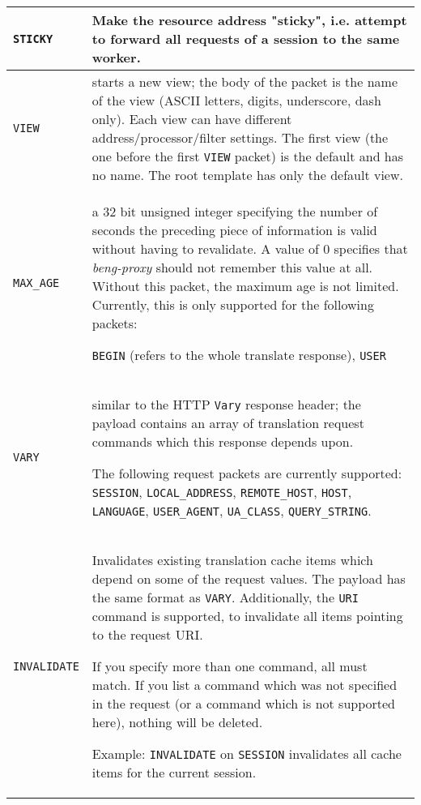 \documentclass[a4paper,12pt]{article}
\begin{document}
\begin{longtable}{|l|p{8cm}|}
\hline

\verb|STICKY| & Make the resource address "sticky", i.e. attempt to
forward all requests of a session to the same worker. \\

\hline

\verb|VIEW| & starts a new view; the body of the packet is the name
of the view (ASCII letters, digits, underscore, dash only).  Each view
can have different address/processor/filter settings.  The first view
(the one before the first \verb|VIEW| packet) is the default and has
no name.  The root template has only the default view. \\

\hline

\verb|MAX_AGE| & a 32 bit unsigned integer specifying the number of
seconds the preceding piece of information is valid without having to
revalidate.  A value of 0 specifies that \emph{beng-proxy} should not
remember this value at all.  Without this packet, the maximum age is
not limited.  Currently, this is only supported for the following
packets:

\verb|BEGIN| (refers to the whole translate response), \verb|USER|
\\

\hline

\verb|VARY| & similar to the HTTP \texttt{Vary} response header;
the payload contains an array of translation request commands which
this response depends upon.

The following request packets are currently supported:
\verb|SESSION|,
\verb|LOCAL_ADDRESS|,
\verb|REMOTE_HOST|, \verb|HOST|, \verb|LANGUAGE|,
\verb|USER_AGENT|, \verb|UA_CLASS|, \verb|QUERY_STRING|.

\\

\hline

\verb|INVALIDATE| & Invalidates existing translation cache items
which depend on some of the request values.  The payload has the same
format as \verb|VARY|.  Additionally, the \verb|URI| command is
supported, to invalidate all items pointing to the request URI.

If you specify more than one command, all must match.  If you list a
command which was not specified in the request (or a command which is
not supported here), nothing will be deleted.

Example: \verb|INVALIDATE| on \verb|SESSION| invalidates all cache
items for the current session.


\end{longtable}
\end{document}
